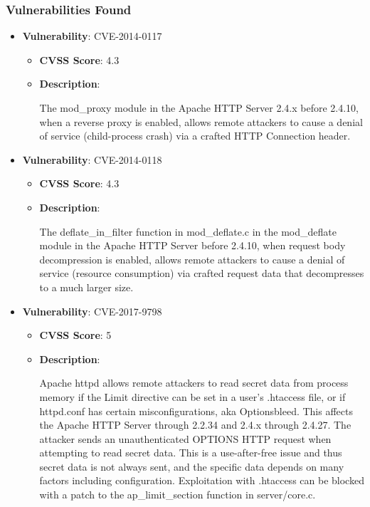 \documentclass{article}
\begin{document}
\subsubsection*{Vulnerabilities Found}

\begin{itemize}
    
        \item \textbf{Vulnerability}: CVE-2014-0117
        \begin{itemize}
            \item \textbf{CVSS Score}:  4.3 
            \item \textbf{Description}:
            \parbox[t]{0.9\linewidth}{
                \ttfamily The mod\_proxy module in the Apache HTTP Server 2.4.x before 2.4.10, when a reverse proxy is enabled, allows remote attackers to cause a denial of service (child-process crash) via a crafted HTTP Connection header.
            }
        \end{itemize}
    
        \item \textbf{Vulnerability}: CVE-2014-0118
        \begin{itemize}
            \item \textbf{CVSS Score}:  4.3 
            \item \textbf{Description}:
            \parbox[t]{0.9\linewidth}{
                \ttfamily The deflate\_in\_filter function in mod\_deflate.c in the mod\_deflate module in the Apache HTTP Server before 2.4.10, when request body decompression is enabled, allows remote attackers to cause a denial of service (resource consumption) via crafted request data that decompresses to a much larger size.
            }
        \end{itemize}
    
        \item \textbf{Vulnerability}: CVE-2017-9798
        \begin{itemize}
            \item \textbf{CVSS Score}:  5 
            \item \textbf{Description}:
            \parbox[t]{0.9\linewidth}{
                \ttfamily Apache httpd allows remote attackers to read secret data from process memory if the Limit directive can be set in a user's .htaccess file, or if httpd.conf has certain misconfigurations, aka Optionsbleed. This affects the Apache HTTP Server through 2.2.34 and 2.4.x through 2.4.27. The attacker sends an unauthenticated OPTIONS HTTP request when attempting to read secret data. This is a use-after-free issue and thus secret data is not always sent, and the specific data depends on many factors including configuration. Exploitation with .htaccess can be blocked with a patch to the ap\_limit\_section function in server/core.c.
            }
        \end{itemize}
    

\end{itemize}
\end{document}
